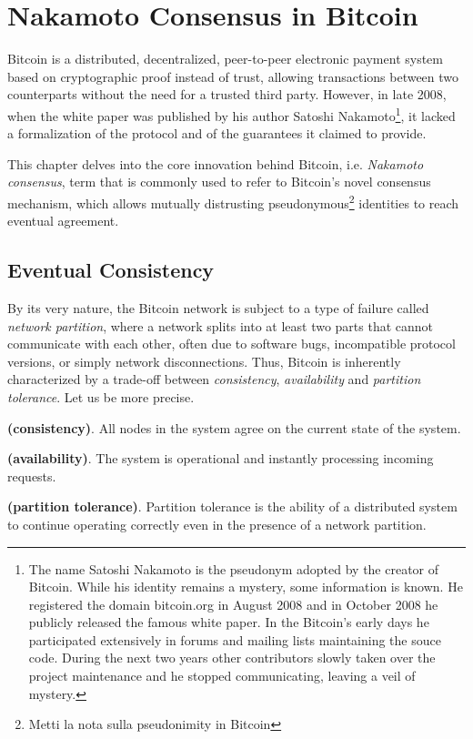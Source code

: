 \chapter{Nakamoto Consensus in Bitcoin}
\label{chpr:btc}
Bitcoin is a distributed, decentralized, peer-to-peer electronic payment system based on cryptographic proof instead of trust, allowing transactions between two counterparts without the need for a trusted third party. However, in late 2008, when the white paper was published by his author Satoshi Nakamoto\footnote{The name Satoshi Nakamoto is the pseudonym adopted by the creator of Bitcoin. While his identity remains a mystery, some information is known. He registered the domain bitcoin.org in August 2008 and in October 2008 he publicly released the famous white paper. In the Bitcoin's early days he participated extensively in forums and mailing lists maintaining the souce code. During the next two years other contributors slowly taken over the project maintenance and he stopped communicating, leaving a veil of mystery.}, it lacked a formalization of the protocol and of the guarantees it claimed to provide.

\bigskip
\noindent
This chapter delves into the core innovation behind Bitcoin, i.e. \textit{Nakamoto consensus}, term that is commonly used to refer to Bitcoin's novel consensus mechanism, which allows mutually distrusting pseudonymous\footnote{Metti la nota sulla pseudonimity in Bitcoin} identities to reach eventual agreement.

\bigskip
\section{Eventual Consistency}
By its very nature, the Bitcoin network is subject to a type of failure called \textit{network partition}, where a network splits into at least two parts that cannot communicate with each other, often due to software bugs, incompatible protocol versions, or simply network disconnections.
Thus, Bitcoin is inherently characterized by a trade-off between \textit{consistency}, \textit{availability} and \textit{partition tolerance}. Let us be more precise.
\begin{mydef} {\bf (consistency)}.
    All nodes in the system agree on the current state of the system.
\end{mydef}
\begin{mydef} {\bf (availability)}.
    The system is operational and instantly processing incoming requests.
\end{mydef}
\begin{mydef} {\bf (partition tolerance)}.
    Partition tolerance is the ability of a distributed system to continue operating correctly even in the presence of a network partition.
\end{mydef}

